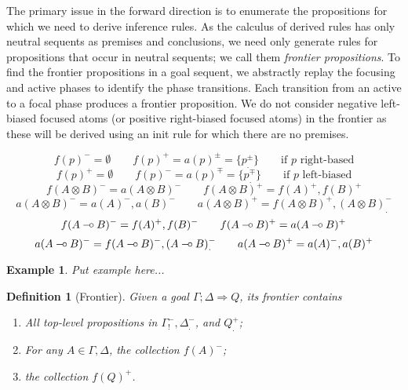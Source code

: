\documentclass{article}
\newtheorem{definition}{Definition}
\newtheorem{example}{Example}
\def\limp {\mathbin{{-}\mkern-3.5mu{\circ}}}
\newcommand{\decplus}[1]{#1^+}
\newcommand{\decminus}[1]{#1^-}
\newcommand{\declinear}[1]{#1_.}
\newcommand{\decunrestr}[1]{#1_!}
\newcommand{\decpluslinear}[1]{\decplus{\declinear{#1}}}
\newcommand{\decminuslinear}[1]{\decminus{\declinear{#1}}}
\newcommand{\decplusminus}[1]{#1^{\pm}}
\newcommand{\decminusplus}[1]{#1^{\mp}}
\begin{document}
The primary issue in the forward direction is to enumerate the propositions for
which we need to derive inference rules. As the calculus of derived rules has
only neutral sequents as premises and conclusions, we need only generate rules
for propositions that occur in neutral sequents; we call them \emph{frontier
  propositions}. To find the frontier propositions in a goal sequent, we
abstractly replay the focusing and active phases to identify the phase
transitions. Each transition from an active to a focal phase produces a frontier
proposition. We do not consider negative left-biased focused atoms (or positive
right-biased focused atoms) in the frontier as these will be derived using an
init rule for which there are no premises.

\[
  \decminus{f(p)} = \emptyset \qquad
  \decplus{f(p)} = \decplusminus{a(p)} = \{
  \decplusminus{\declinear{p}} \} \qquad \text{if $p$ right-based}
\]
\[
  \decplus{f(p)} = \emptyset \qquad
  \decminus{f(p)} = \decminusplus{a(p)} = \{
  \decminusplus{\declinear{p}} \} \qquad \text{if $p$ left-biased}
\]
\[
  \decminus{f(A \otimes B)} = \decminus{a(A \otimes B)} \qquad
  \decplus{f(A \otimes B)} = \decplus{f(A)}, \decplus{f(B)}
\]
\[
  \decminus{a(A\otimes B)} = \decminus{a(A)}, \decminus{a(B)} \qquad
  \decplus{a(A\otimes B)} = \decplus{f(A \otimes B)}, \decminuslinear{(A \otimes B)}
\]
\[
  \decminus{f(A \limp B)} = \decplus{f(A)}, \decminus{f(B)} \qquad
  \decplus{f(A \limp B)} = \decplus{a(A \limp B)}
\]
\[
  \decminus{a(A \limp B)} = \decminus{f(A \limp B)}, \decminuslinear{(A \limp
    B)}
  \qquad
  \decplus{a(A\limp B)} = \decminus{a(A)}, \decplus{a(B)}
\]

\begin{example}
  Put example here...
\end{example}

\begin{definition}[Frontier]
  Given a goal $\Gamma;\Delta \Longrightarrow Q$, its frontier contains

  \begin{enumerate}
  \item All top-level propositions in $\decunrestr{\decminus{\Gamma}},
    \decminuslinear{\Delta}$, and $\decpluslinear{Q}$;
  \item For any $A \in \Gamma, \Delta$, the collection $\decminus{f(A)}$;
  \item the collection $\decplus{f(Q)}$.
  \end{enumerate}
\end{definition}
\end{document}
